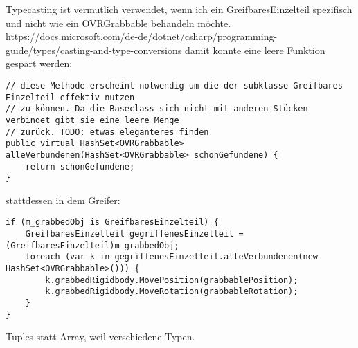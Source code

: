 \documentclass[11pt]{article} %
\begin{document}
Typecasting ist vermutlich verwendet, wenn ich ein GreifbaresEinzelteil spezifisch und nicht wie ein OVRGrabbable behandeln möchte. 
https://docs.microsoft.com/de-de/dotnet/csharp/programming-guide/types/casting-and-type-conversions
damit konnte eine leere Funktion gespart werden:

\begin{lstlisting}
// diese Methode erscheint notwendig um die der subklasse Greifbares Einzelteil effektiv nutzen 
// zu können. Da die Baseclass sich nicht mit anderen Stücken verbindet gibt sie eine leere Menge
// zurück. TODO: etwas eleganteres finden
public virtual HashSet<OVRGrabbable> alleVerbundenen(HashSet<OVRGrabbable> schonGefundene) {
	return schonGefundene;
}
\end{lstlisting}

stattdessen in dem Greifer: 

\begin{lstlisting}
if (m_grabbedObj is GreifbaresEinzelteil) {
	GreifbaresEinzelteil gegriffenesEinzelteil = (GreifbaresEinzelteil)m_grabbedObj;
	foreach (var k in gegriffenesEinzelteil.alleVerbundenen(new HashSet<OVRGrabbable>())) {
		k.grabbedRigidbody.MovePosition(grabbablePosition);
		k.grabbedRigidbody.MoveRotation(grabbableRotation);
	}
}
\end{lstlisting}

Tuples statt Array, weil verschiedene Typen.
\end{document}
